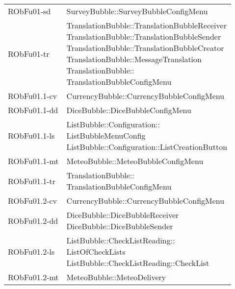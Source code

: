 \begin{center}
\begin{longtable}{|
*{1}{>{\centering\arraybackslash}m{2.5cm}|}
*{1}{>{\centering\arraybackslash}m{7.5cm}|}}
{\\}\\\hline
RObFu01-sd & \makecell[l]{SurveyBubble::SurveyBubbleConfigMenu
\\}\\\hline
RObFu01-tr & \makecell[l]{TranslationBubble::TranslationBubbleReceiver
\\TranslationBubble::TranslationBubbleSender
\\TranslationBubble::TranslationBubbleCreator
\\TranslationBubble::MessageTranslation
\\TranslationBubble:: \\ \hfill TranslationBubbleConfigMenu
\\}\\\hline
RObFu01.1-cv & \makecell[l]{CurrencyBubble::CurrencyBubbleConfigMenu
\\}\\\hline
RObFu01.1-dd & \makecell[l]{DiceBubble::DiceBubbleConfigMenu
\\}\\\hline
RObFu01.1-ls & \makecell[l]{ListBubble::Configuration:: \\ \hfill ListBubbleMenuConfig
\\ListBubble::Configuration::ListCreationButton
\\}\\\hline
RObFu01.1-mt & \makecell[l]{MeteoBubble::MeteoBubbleConfigMenu
\\}\\\hline
RObFu01.1-tr & \makecell[l]{TranslationBubble:: \\ \hfill TranslationBubbleConfigMenu
\\}\\\hline
RObFu01.2-cv & \makecell[l]{CurrencyBubble::CurrencyBubbleConfigMenu
\\}\\\hline
RObFu01.2-dd & \makecell[l]{DiceBubble::DiceBubbleReceiver
\\DiceBubble::DiceBubbleSender
\\}\\\hline
RObFu01.2-ls & \makecell[l]{ListBubble::CheckListReading:: \\ \hfill ListOfCheckLists
\\ListBubble::CheckListReading::CheckList
\\}\\\hline
RObFu01.2-mt & \makecell[l]{MeteoBubble::MeteoDelivery
\\}\\\hline

\end{longtable}
\end{center}
